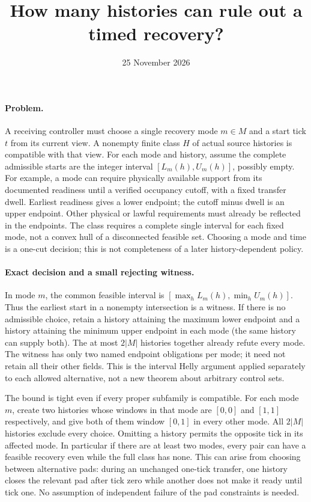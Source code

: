 \documentclass[11pt]{article}
\title{How many histories can rule out a timed recovery?}
\date{25 November 2026}
\begin{document}
\maketitle
\paragraph{Problem.}
A receiving controller must choose a single recovery mode \(m\in M\)
and a start tick \(t\) from its current view. A nonempty finite class
\(H\) of actual source histories is compatible with that view.
For each mode and history, assume the complete admissible starts
are the integer interval \([L_m(h),U_m(h)]\), possibly empty.
For example, a mode can require physically available support
from its documented readiness until a verified occupancy cutoff,
with a fixed transfer dwell. Earliest readiness gives a lower
endpoint; the cutoff minus dwell is an upper endpoint.
Other physical or lawful requirements must already be reflected
in the endpoints. The class requires a complete single interval
for each fixed mode, not a convex hull of a disconnected feasible
set. Choosing a mode and time is a one-cut decision; this is not
completeness of a later history-dependent policy.

\paragraph{Exact decision and a small rejecting witness.}
In mode \(m\), the common feasible interval is
\([\max_hL_m(h),\min_hU_m(h)]\).
Thus the earliest start in a nonempty intersection is a witness.
If there is no admissible choice, retain a history attaining the
maximum lower endpoint and a history attaining the minimum upper
endpoint in each mode (the same history can supply both).
The at most \(2|M|\) histories together already refute every mode.
The witness has only two named endpoint obligations per mode;
it need not retain all their other fields.
This is the interval Helly argument applied separately to each
allowed alternative, not a new theorem about arbitrary control sets.

The bound is tight even if every proper subfamily is compatible.
For each mode \(m\), create two histories whose windows in that mode
are \([0,0]\) and \([1,1]\) respectively, and give both of them
window \([0,1]\) in every other mode.
All \(2|M|\) histories exclude every choice. Omitting a history
permits the opposite tick in its affected mode.
In particular if there are at least two modes, every pair can have
a feasible recovery even while the full class has none.
This can arise from choosing between alternative pads: during an
unchanged one-tick transfer, one history closes the relevant pad
after tick zero while another does not make it ready until tick one.
No assumption of independent failure of the pad constraints is needed.
\end{document}
